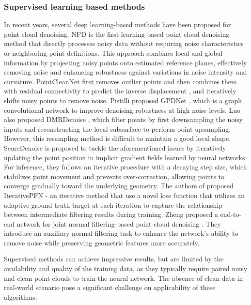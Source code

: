     \subsubsection{Supervised learning based methods}
In recent years, several deep learning-based methods \cite{rakotosaona2020PCN,hermosilla2019TotalDenoising,luo2020DMR,luo_score-based_2021} have been proposed for point cloud denoising. NPD \cite{NPD2019} is the first learning-based point cloud denoising method that directly processes noisy data without requiring noise characteristics or neighboring point definitions. This approach combines local and global information by projecting noisy points onto estimated reference planes, effectively removing noise and enhancing robustness against variations in noise intensity and curvature. PointCleanNet\cite{rakotosaona2020PCN} first removes outlier points and then combines them with residual connectivity to predict the inverse displacement \cite{Guerrero2017PCPNetLL}, and iteratively shifts noisy points to remove noise. Pistilli \etal proposed GPDNet \cite{gpdnet2020}, which is a graph convolutional network to improve denoising robustness at high noise levels. Luo \etal also proposed  DMRDenoise \cite{luo2020DMR}, which filter
points by first downsampling the noisy inputs and reconstructing the local subsurface to perform point upsampling. However, this resampling method is difficult to maintain a good local shape. ScoreDenoise \cite{luo_score-based_2021} is proposed to tackle the aforementioned issues by iteratively updating the point position in implicit gradient fields learned by neural networks. For inference, they follows an iterative procedure with a decaying step size, which stabilizes point movement and prevents over-correction, allowing points to converge gradually toward the underlying geometry. The authors of \cite{de_Silva_Edirimuni_2023_CVPR} proposed IterativePFN - an iterative method that use a novel loss function that utilizes an adaptive ground truth target at each iteration to capture the relationship between intermediate filtering results during training. Zheng \etal proposed a end-to-end network for joint normal filtering-based point cloud denoising \cite{10173632}. They introduce an auxiliary normal filtering task to enhance the network's ability to remove noise while preserving geometric features more accurately.

Supervised methods can achieve impressive results, but are limited by the availability and quality of the training data, as they typically require paired noisy and clean point clouds to train the neural network. The absence of clean data in real-world scenario pose a significant challenge on applicability of these algorithms.

